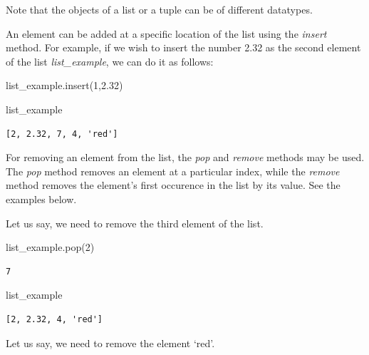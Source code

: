 \documentclass[
  letterpaper,
  DIV=11,
  numbers=noendperiod]{scrreprt}
\newenvironment{Shaded}{\begin{snugshade}}{\end{snugshade}}
\newcommand{\DecValTok}[1]{\textcolor[rgb]{0.68,0.00,0.00}{#1}}
\newcommand{\FloatTok}[1]{\textcolor[rgb]{0.68,0.00,0.00}{#1}}
\newcommand{\NormalTok}[1]{\textcolor[rgb]{0.00,0.23,0.31}{#1}}
\begin{document}
Note that the objects of a list or a tuple can be of different
datatypes.

An element can be added at a specific location of the list using the
\emph{insert} method. For example, if we wish to insert the number 2.32
as the second element of the list \emph{list\_example}, we can do it as
follows:

\begin{Shaded}
\begin{Highlighting}[]
\NormalTok{list\_example.insert(}\DecValTok{1}\NormalTok{,}\FloatTok{2.32}\NormalTok{)}
\end{Highlighting}
\end{Shaded}

\begin{Shaded}
\begin{Highlighting}[]
\NormalTok{list\_example}
\end{Highlighting}
\end{Shaded}

\begin{verbatim}
[2, 2.32, 7, 4, 'red']
\end{verbatim}

For removing an element from the list, the \emph{pop} and \emph{remove}
methods may be used. The \emph{pop} method removes an element at a
particular index, while the \emph{remove} method removes the element's
first occurence in the list by its value. See the examples below.

Let us say, we need to remove the third element of the list.

\begin{Shaded}
\begin{Highlighting}[]
\NormalTok{list\_example.pop(}\DecValTok{2}\NormalTok{)}
\end{Highlighting}
\end{Shaded}

\begin{verbatim}
7
\end{verbatim}

\begin{Shaded}
\begin{Highlighting}[]
\NormalTok{list\_example}
\end{Highlighting}
\end{Shaded}

\begin{verbatim}
[2, 2.32, 4, 'red']
\end{verbatim}

Let us say, we need to remove the element `red'.
\end{document}
